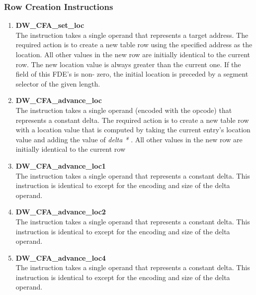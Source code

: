 \subsubsection{Row Creation Instructions}
\label{chap:rowcreationinstructions}
\begin{enumerate}[1. ]

\item \textbf{DW\-\_CFA\-\_set\-\_loc} \\
The  instruction 
takes a single operand that
represents a target address. The required action is to create a
new table row using the specified address as the location. All
other values in the new row are initially identical to the
current row. The new location value is always greater than
the current one. 
If the  field of this FDE's 
is non- zero, the initial location is preceded by a segment
selector of the given length.


\item \textbf{DW\-\_CFA\-\_advance\-\_loc} \\
The  instruction takes a single operand (encoded
with the opcode) that represents a constant delta. The required
action is to create a new table row with a location value that
is computed by taking the current entry\textquoteright s location value
and adding the value of 
\textit{delta * }. 
All
other values in the new row are initially identical to the
current row

\item \textbf{DW\-\_CFA\-\_advance\-\_loc1} \\
The  instruction takes a single 
operand that represents a constant delta. This instruction
is identical to  except for the encoding
and size of the delta operand.

\item \textbf{DW\-\_CFA\-\_advance\-\_loc2} \\
The  instruction takes a single
operand that represents a constant delta. This instruction
is identical to  except for the encoding
and size of the delta operand.

\item \textbf{DW\-\_CFA\-\_advance\-\_loc4} \\
The  instruction takes a single
operand that represents a constant delta. This instruction
is identical to  except for the encoding
and size of the delta operand.

\end{enumerate}

